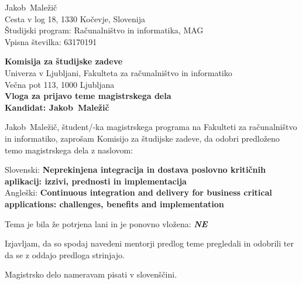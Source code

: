 \documentclass[a4paper, 12pt]{article}
\begin{document}
\newcommand{\ImeKandidata}{Jakob} %
\newcommand{\PriimekKandidata}{Maležič} %
\newcommand{\VpisnaStevilka}{63170191} %
\newcommand{\StudijskiProgram}{Računalništvo in informatika, MAG} %
\newcommand{\NaslovBivalisca}{ Cesta v log 18, 1330 Kočevje, Slovenija } %
\newcommand{\SLONaslov}{Neprekinjena integracija in dostava poslovno kritičnih aplikacij: izzivi, prednosti in implementacija} %
\newcommand{\ENGNaslov}{Continuous integration and delivery for business critical applications: challenges, benefits and implementation} %


\newcommand{\Kandidat}{\ImeKandidata~\PriimekKandidata}
\noindent
\Kandidat\\
\NaslovBivalisca \\
Študijski program: \StudijskiProgram \\
Vpisna številka: \VpisnaStevilka
\bigskip

{\bf Komisija za študijske zadeve}\\
Univerza v Ljubljani, Fakulteta za računalništvo in informatiko\\
Večna pot 113, 1000 Ljubljana\\

{\Large\bf
{\centering
    Vloga za prijavo teme magistrskega dela \\%
\large Kandidat: \Kandidat \\[10mm]}}


\Kandidat, študent/-ka magistrskega programa na Fakulteti za računalništvo in informatiko, zaprošam Komisijo za študijske zadeve, da odobri predloženo temo magistrskega dela z naslovom:

Slovenski: {\bf \SLONaslov}\\
Angleški: {\bf \ENGNaslov}

Tema je bila že potrjena lani in je ponovno vložena: {\bf \textit{NE}}

Izjavljam, da so spodaj navedeni mentorji predlog teme pregledali in odobrili ter da se z oddajo predloga strinjajo.

Magistrsko delo nameravam pisati v slovenščini. %
\end{document}
